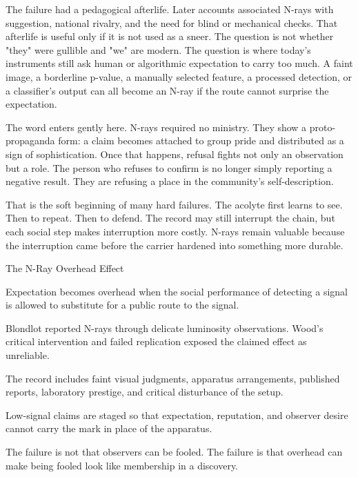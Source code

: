 The failure had a pedagogical afterlife. Later accounts associated N-rays
with suggestion, national rivalry, and the need for blind or mechanical
checks. That afterlife is useful only if it is not used as a sneer. The
question is not whether "they" were gullible and "we" are modern. The question
is where today's instruments still ask human or algorithmic expectation to
carry too much. A faint image, a borderline p-value, a manually selected
feature, a processed detection, or a classifier's output can all become an
N-ray if the route cannot surprise the expectation.

The word  enters gently here. N-rays required no ministry.
They show a proto-propaganda form: a claim becomes attached to group pride
and distributed as a sign of sophistication. Once that happens, refusal
fights not only an observation but a role. The person who refuses to confirm
is no longer simply reporting a negative result. They are refusing a place
in the community's self-description.

That is the soft beginning of many hard failures. The acolyte first learns to
see. Then to repeat. Then to defend. The record may still interrupt the chain,
but each social step makes interruption more costly. N-rays remain valuable
because the interruption came before the carrier hardened into something more
durable.

\begin{phenom}{The N-Ray Overhead Effect~\cite{blondlot1904,wood1904}}
\label{ph:n-ray-overhead}

\PhStatement
Expectation becomes overhead when the social performance of detecting a signal
is allowed to substitute for a public route to the signal.

\PhOrigin
Blondlot reported N-rays through delicate luminosity observations. Wood's
critical intervention and failed replication exposed the claimed effect as
unreliable.

\PhObservation
The record includes faint visual judgments, apparatus arrangements, published
reports, laboratory prestige, and critical disturbance of the setup.

\PhConstraint
Low-signal claims are staged so that expectation, reputation, and observer
desire cannot carry the mark in place of the apparatus.

\PhConsequence
The failure is not that observers can be fooled. The failure is that overhead
can make being fooled look like membership in a discovery.
\end{phenom}

